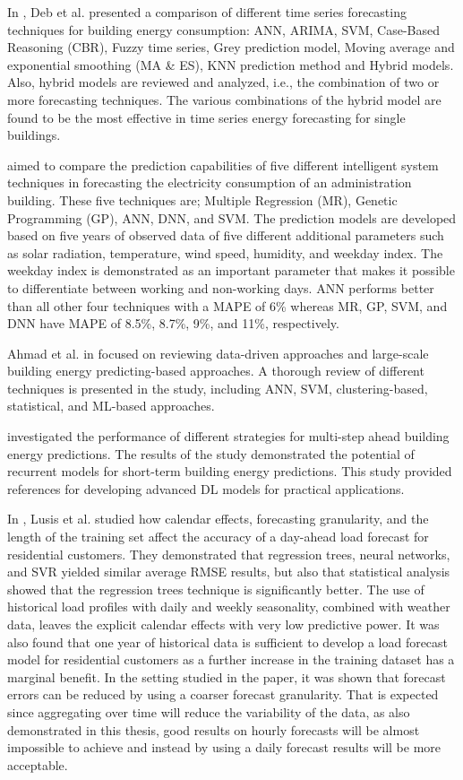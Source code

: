 In \cite{DEB2017902}, Deb et al. presented a comparison of different time series forecasting techniques for building energy consumption: ANN, ARIMA, SVM, Case-Based Reasoning (CBR), Fuzzy time series, Grey prediction model, Moving average and exponential smoothing (MA \& ES), KNN prediction method and Hybrid models.
Also, hybrid models are reviewed and analyzed, i.e., the combination of two or more forecasting techniques.
The various combinations of the hybrid model are found to be the most effective in time series energy forecasting for single buildings.

\cite{AMBER2018886} aimed to compare the prediction capabilities of five different intelligent system techniques in forecasting the electricity consumption of an administration building.
These five techniques are; Multiple Regression (MR), Genetic Programming (GP), ANN, DNN, and SVM.
The prediction models are developed based on five years of observed data of five different additional parameters such as solar radiation, temperature, wind speed, humidity, and weekday index.
The weekday index is demonstrated as an important parameter that makes it possible to differentiate between working and non-working days.
ANN performs better than all other four techniques with a MAPE of 6\% whereas MR, GP, SVM, and DNN have MAPE of 8.5\%, 8.7\%, 9\%, and 11\%, respectively.

Ahmad et al. in \cite{AHMAD2018301} focused on reviewing data-driven approaches and large-scale building energy predicting-based approaches.
A thorough review of different techniques is presented in the study, including ANN, SVM, clustering-based, statistical, and ML-based approaches.

\cite{FAN2019700} investigated the performance of different strategies for multi-step ahead building energy predictions.
The results of the study demonstrated the potential of recurrent models for short-term building energy predictions.
This study provided references for developing advanced DL models for practical applications.

In \cite{LUSIS2017654}, Lusis et al. studied how calendar effects, forecasting granularity, and the length of the training set affect the accuracy of a day-ahead load forecast for residential customers.
They demonstrated that regression trees, neural networks, and SVR yielded similar average RMSE results, but also that statistical analysis showed that the regression trees technique is significantly better.
The use of historical load profiles with daily and weekly seasonality, combined with weather data, leaves the explicit calendar effects with very low predictive power.
It was also found that one year of historical data is sufficient to develop a load forecast model for residential customers as a further increase in the training dataset has a marginal benefit.
In the setting studied in the paper, it was shown that forecast errors can be reduced by using a coarser forecast granularity.
That is expected since aggregating over time will reduce the variability of the data, as also demonstrated in this thesis, good results on hourly forecasts will be almost impossible to achieve and instead by using a daily forecast results will be more acceptable.

